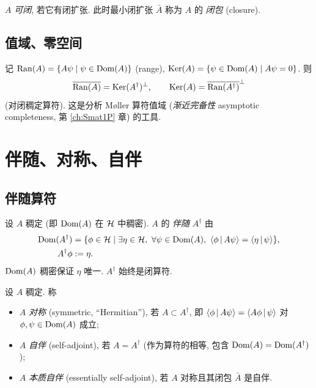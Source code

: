 \begin{definition}[可闭算符]\label{def:hilbert-closable}
$A$ \emph{可闭}, 若它有闭扩张. 此时最小闭扩张 $\bar A$ 称为 $A$ 的 \emph{闭包} (closure).
\end{definition}

\subsection{值域、零空间}

记 $\operatorname{Ran}(A)=\{A\psi\mid\psi\in\operatorname{Dom}(A)\}$ (range), $\operatorname{Ker}(A)=\{\psi\in\operatorname{Dom}(A)\mid A\psi=0\}$. 则
\begin{equation}\label{eq:hilbert-range-ker}
\overline{\operatorname{Ran}(A)}=\operatorname{Ker}(A^\dagger)^{\perp},\qquad \operatorname{Ker}(A)=\overline{\operatorname{Ran}(A^\dagger)}^{\perp}
\end{equation}
(对闭稠定算符). 这是分析 Møller 算符值域 (\emph{渐近完备性} asymptotic completeness, 第 \ref{ch:Smat1P} 章) 的工具.

\section{伴随、对称、自伴}\label{sec:hilbert-adjoint}

\subsection{伴随算符}

\begin{definition}[稠定算符的伴随]\label{def:hilbert-adjoint}
设 $A$ 稠定 (即 $\operatorname{Dom}(A)$ 在 $\mathcal{H}$ 中稠密). $A$ 的 \emph{伴随} $A^\dagger$ 由
\begin{align}
\Dom(A^\dagger)&=\{\phi\in\Hilb \mid \exists\eta\in\Hilb,\ \forall\psi\in\Dom(A),\ \inn{\phi}{A\psi}=\inn{\eta}{\psi}\},\notag\\
A^\dagger\phi&:=\eta. \label{eq:hilbert-adjoint-def}
\end{align}
$\operatorname{Dom}(A)$ 稠密保证 $\eta$ 唯一. $A^\dagger$ 始终是闭算符.
\end{definition}

\begin{definition}[对称、自伴、本质自伴]\label{def:hilbert-sym-sa}
设 $A$ 稠定. 称
\begin{itemize}
    \item $A$ \emph{对称} (symmetric, ``Hermitian''), 若 $A\subset A^\dagger$, 即 $\left\langle \phi \,\middle|\, A\psi \right\rangle=\left\langle A\phi \,\middle|\, \psi \right\rangle$ 对 $\phi,\psi\in\operatorname{Dom}(A)$ 成立;
    \item $A$ \emph{自伴} (self-adjoint), 若 $A=A^\dagger$ (作为算符的相等, 包含 $\operatorname{Dom}(A)=\operatorname{Dom}(A^\dagger)$);
    \item $A$ \emph{本质自伴} (essentially self-adjoint), 若 $A$ 对称且其闭包 $\bar A$ 是自伴.
\end{itemize}
\end{definition}

